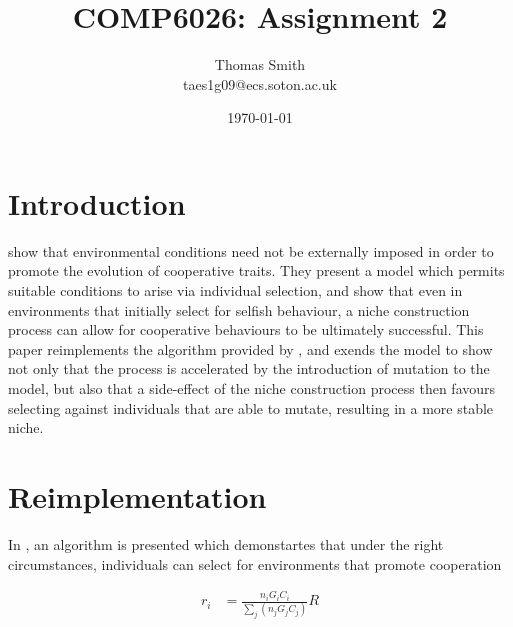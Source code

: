 \documentclass[11pt]{article}
\begin{document}
\title      {\textbf{COMP6026: Assignment 2}}
\author	    {Thomas Smith\\taes1g09@ecs.soton.ac.uk}
\date       {\today}
\maketitle
\section{Introduction}

\citet*{orig} show that environmental conditions need not be externally imposed in order to promote the evolution of cooperative traits. They present a model which permits suitable conditions to arise via individual selection, and show that even in environments that initially select for selfish behaviour, a niche construction process can allow for cooperative behaviours to be ultimately successful. This paper reimplements the algorithm provided by \citet{orig}, and exends the model to show not only that the process is accelerated by the introduction of mutation to the model, but also that a side-effect of the niche construction process then favours selecting against individuals that are able to mutate, resulting in a more stable niche.




\section{Reimplementation}
In \citet{orig}, an algorithm is presented which demonstartes that under the right circumstances, individuals can select for environments that promote cooperation


\begin{align} \label{eq:desire}
  r_i &= \frac{n_iG_iC_i}{\sum\limits_{j}(n_jG_jC_j)}R
\end{align}
\end{document}
